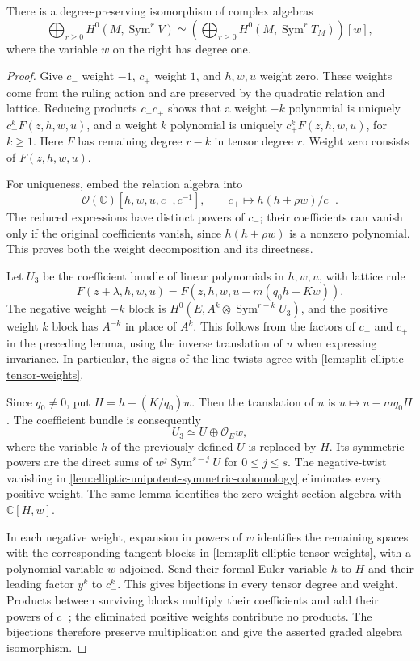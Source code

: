 \begin{theorem}\label{thm:elliptic-extension-polynomial-ring}
There is a degree-preserving isomorphism of complex algebras
\[
 \bigoplus_{r\geq0}H^0(M,\operatorname{Sym}^rV)
 \simeq
 \left(\bigoplus_{r\geq0}H^0(M,\operatorname{Sym}^rT_M)\right)[w],
\]
where the variable $w$ on the right has degree one.
\end{theorem}
\begin{proof}
Give $c_-$ weight $-1$, $c_+$ weight $1$, and $h,w,u$ weight zero. These weights come from the ruling action and are preserved by the quadratic relation and lattice. Reducing products $c_-c_+$ shows that a weight $-k$ polynomial is uniquely $c_-^kF(z,h,w,u)$, and a weight $k$ polynomial is uniquely $c_+^kF(z,h,w,u)$, for $k\geq1$. Here $F$ has remaining degree $r-k$ in tensor degree $r$. Weight zero consists of $F(z,h,w,u)$.

For uniqueness, embed the relation algebra into
\[
 \mathcal O(\mathbb C)[h,w,u,c_-,c_-^{-1}],
 \qquad c_+\longmapsto h(h+\rho w)/c_-.
\]
The reduced expressions have distinct powers of $c_-$; their coefficients can vanish only if the original coefficients vanish, since $h(h+\rho w)$ is a nonzero polynomial. This proves both the weight decomposition and its directness.

Let $U_3$ be the coefficient bundle of linear polynomials in $h,w,u$, with lattice rule
\[
 F(z+\lambda,h,w,u)
       =F(z,h,w,u-m(q_0h+Kw)).
\]
The negative weight $-k$ block is $H^0(E,A^k\otimes\operatorname{Sym}^{r-k}U_3)$, and the positive weight $k$ block has $A^{-k}$ in place of $A^k$. This follows from the factors of $c_-$ and $c_+$ in the preceding lemma, using the inverse translation of $u$ when expressing invariance. In particular, the signs of the line twists agree with \cref{lem:split-elliptic-tensor-weights}.

Since $q_0\ne0$, put $H=h+(K/q_0)w$. Then the translation of $u$ is $u\mapsto u-mq_0H$. The coefficient bundle is consequently
\[
 U_3\simeq U\oplus\mathcal O_Ew,
\]
where the variable $h$ of the previously defined $U$ is replaced by $H$. Its symmetric powers are the direct sums of $w^j\operatorname{Sym}^{s-j}U$ for $0\leq j\leq s$. The negative-twist vanishing in \cref{lem:elliptic-unipotent-symmetric-cohomology} eliminates every positive weight. The same lemma identifies the zero-weight section algebra with $\mathbb C[H,w]$.

In each negative weight, expansion in powers of $w$ identifies the remaining spaces with the corresponding tangent blocks in \cref{lem:split-elliptic-tensor-weights}, with a polynomial variable $w$ adjoined. Send their formal Euler variable $h$ to $H$ and their leading factor $y^k$ to $c_-^k$. This gives bijections in every tensor degree and weight. Products between surviving blocks multiply their coefficients and add their powers of $c_-$; the eliminated positive weights contribute no products. The bijections therefore preserve multiplication and give the asserted graded algebra isomorphism.
\end{proof}

